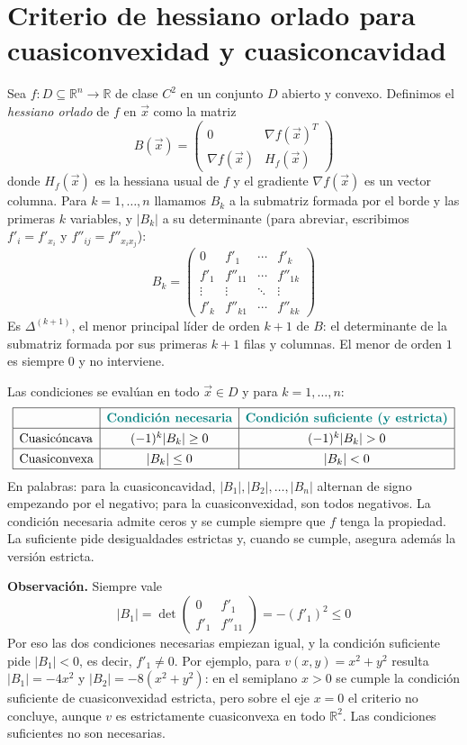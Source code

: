 \documentclass{article}
\newcommand{\R}{\ensuremath{\mathbb{R}}}
\newcommand{\vect}[1]{\vec{#1}}
\begin{document}
\section*{Criterio de hessiano orlado para cuasiconvexidad y cuasiconcavidad}
Sea \(f\colon D\subseteq\R^n\to\R\) de clase \(C^2\) en un conjunto \(D\) abierto y convexo. Definimos el \emph{hessiano orlado} de \(f\) en \(\vect{x}\) como la matriz
\[
B(\vect{x})
=\begin{pmatrix}
0 & \nabla f(\vect{x})^T \\[4pt]
\nabla f(\vect{x}) & H_f(\vect{x})
\end{pmatrix}
\]
donde \(H_f(\vect{x})\) es la hessiana usual de \(f\) y el gradiente \(\nabla f(\vect{x})\) es un vector columna. Para \(k=1,\dots,n\) llamamos \(B_k\) a la submatriz formada por el borde y las primeras \(k\) variables, y \(|B_k|\) a su determinante (para abreviar, escribimos \(f'_i=f'_{x_i}\) y \(f''_{ij}=f''_{x_ix_j}\)):
\[
B_k=\begin{pmatrix}
0 & f'_1 & \cdots & f'_k\\
f'_1 & f''_{11} & \cdots & f''_{1k}\\
\vdots & \vdots & \ddots & \vdots\\
f'_k & f''_{k1} & \cdots & f''_{kk}
\end{pmatrix}
\]
Es \(\Delta^{(k+1)}\), el menor principal líder de orden \(k+1\) de \(B\): el determinante de la submatriz formada por sus primeras \(k+1\) filas y columnas. El menor de orden \(1\) es siempre \(0\) y no interviene.

\noindent Las condiciones se evalúan en todo \(\vect{x}\in D\) y para \(k=1,\dots,n\):
\[
\renewcommand{\arraystretch}{1.3}
\begin{array}{|l|c|c|}
\hline
 & \textbf{\color{teal}Condición necesaria} & \textbf{\color{teal}Condición suficiente (y estricta)}\\ \hline
\text{Cuasicóncava} & (-1)^k|B_k|\ge 0 & (-1)^k|B_k|> 0\\ \hline
\text{Cuasiconvexa} & |B_k|\le 0 & |B_k|< 0\\ \hline
\end{array}
\]
En palabras: para la cuasiconcavidad, \(|B_1|,|B_2|,\dots,|B_n|\) alternan de signo empezando por el negativo; para la cuasiconvexidad, son todos negativos. La condición necesaria admite ceros y se cumple siempre que \(f\) tenga la propiedad. La suficiente pide desigualdades estrictas y, cuando se cumple, asegura además la versión estricta.

\medskip
\noindent\textbf{Observación.} Siempre vale
\[
|B_1|=\det\begin{pmatrix}0&f'_1\\ f'_1&f''_{11}\end{pmatrix}=-(f'_1)^2\le 0
\]
Por eso las dos condiciones necesarias empiezan igual, y la condición suficiente pide \(|B_1|<0\), es decir, \(f'_1\neq0\). Por ejemplo, para \(v(x,y)=x^2+y^2\) resulta \(|B_1|=-4x^2\) y \(|B_2|=-8(x^2+y^2)\): en el semiplano \(x>0\) se cumple la condición suficiente de cuasiconvexidad estricta, pero sobre el eje \(x=0\) el criterio no concluye, aunque \(v\) es estrictamente cuasiconvexa en todo \(\R^2\). Las condiciones suficientes no son necesarias.
\end{document}
